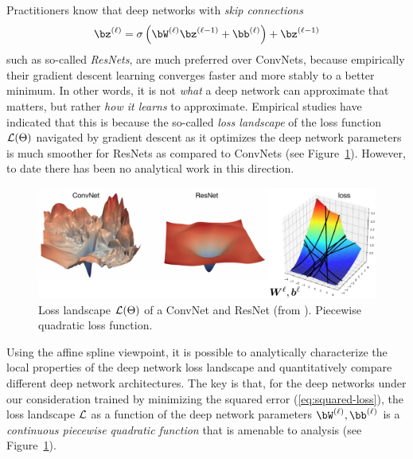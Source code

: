 \documentclass{notices}
\begin{document}
Practitioners know that deep networks with {\em skip connections}
\begin{equation}
\bz^{(\ell)} = \sigma\left(\bW^{(\ell)} \bz^{(\ell-1)} + \bb^{(\ell)} \right) + \bz^{(\ell-1)}
\label{eq:skip}
\end{equation}
such as so-called {\em ResNets}, are much preferred over ConvNets, because empirically their gradient descent learning converges faster and more stably to a better minimum.
In other words, it is not {\em what} a deep network can approximate that matters, but rather {\em how it learns} to approximate. 
Empirical studies have indicated that this is because the so-called {\em loss landscape} of the loss function ${\cal L}(\Theta)$ navigated by gradient descent as it optimizes the deep network parameters is much smoother for ResNets as compared to ConvNets (see Figure~\ref{fig:loss_surface}).
However, to date there has been no analytical work in this direction.


\begin{figure}[h]
    \centering  
\includegraphics[width=1\linewidth]{Figs/loss-tmp1.pdf}
\vspace*{-5mm}
    \caption{\small
    Loss landscape ${\cal L}(\Theta)$ of a ConvNet and ResNet (from \cite{li2018visualizing}). Piecewise quadratic loss function.}
    \label{fig:loss_surface}
\end{figure}



Using the affine spline viewpoint, it is possible to analytically characterize the local properties of the deep network loss landscape and  quantitatively compare different deep network architectures.
The key is that, for the deep networks under our consideration trained by minimizing the squared error (\ref{eq:squared-loss}), the loss landscape ${\cal L}$ as a function of the deep network parameters $\bW^{(\ell)},\bb^{(\ell)}$ is a {\em continuous piecewise quadratic function}  \cite{rolf,ankit2020} that is amenable to analysis (see Figure~\ref{fig:loss_surface}).
\end{document}
